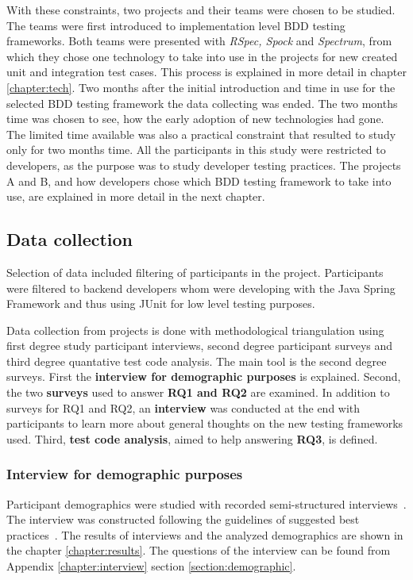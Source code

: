     With these constraints, two projects and their teams were chosen to be studied. The teams were first introduced to
    implementation level BDD testing frameworks. Both teams were presented with \textit{RSpec, Spock} and \textit{Spectrum}, from
    which they chose one technology to take into use in the projects for new created unit and integration test cases. This
    process is explained in more detail in chapter \ref{chapter:tech}. Two months after the initial introduction and time in use for
    the selected BDD testing framework the data collecting was ended. The two months time was chosen to see, how the early
    adoption of new technologies had gone.
    The limited time available was also a practical constraint that resulted to study only for two months time. All the participants
    in this study were restricted to developers, as the purpose was to study developer testing practices. The projects
    A and B, and how developers chose which BDD testing framework to take into use, are explained in more detail in the next chapter.

\subsection{Data collection}
    Selection of data included filtering of participants in the project. Participants were filtered to backend developers
    whom were developing with the Java Spring Framework and thus using JUnit for low level testing purposes.

    Data collection from projects is done with methodological triangulation using first degree study participant interviews, second degree
    participant surveys and third degree quantative test code analysis. The main tool is the second degree surveys.
    First the \textbf{interview for demographic purposes} is explained. Second, the two \textbf{surveys} used to answer
    \textbf{RQ1 and RQ2} are examined. In addition to surveys for RQ1 and RQ2, an \textbf{interview} was conducted at the end with participants to
    learn more about general thoughts on the new testing frameworks used.
    Third, \textbf{test code analysis}, aimed to help answering \textbf{RQ3}, is defined.

    \subsubsection{Interview for demographic purposes}
    Participant demographics were studied with recorded semi-structured interviews~\cite{cohen2006qualitative}.
    The interview was constructed following the guidelines of suggested best practices~\cite{kitchenham2002preliminary}.
    The results of interviews and the analyzed demographics are shown in the chapter
    \ref{chapter:results}. The questions of the interview can be found from Appendix \ref{chapter:interview} section
    \ref{section:demographic}.

